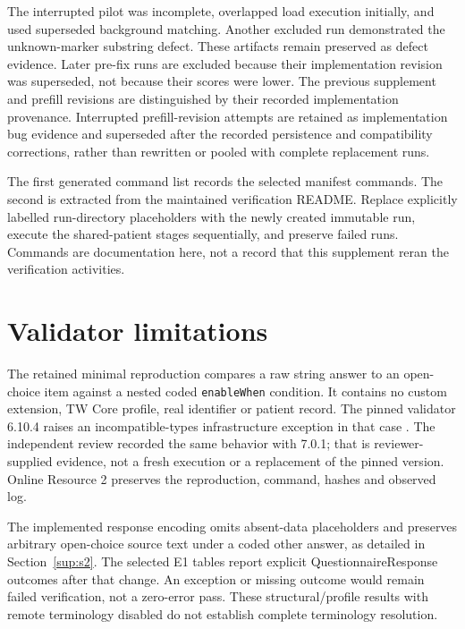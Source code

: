 
The interrupted pilot was incomplete, overlapped load execution initially, and used
superseded background matching. Another excluded run demonstrated the unknown-marker
substring defect. These artifacts remain preserved as defect evidence. Later
pre-fix runs are excluded because their implementation revision was superseded,
not because their scores were lower. The previous supplement and prefill revisions are distinguished by their recorded
implementation provenance. Interrupted prefill-revision attempts are retained as implementation bug
evidence and superseded after the recorded persistence and compatibility
corrections, rather than rewritten or pooled with complete replacement runs.

The first generated command list records the selected manifest commands. The
second is extracted from the maintained verification README. Replace explicitly labelled run-directory placeholders with the newly
created immutable run, execute the shared-patient stages sequentially, and preserve
failed runs. Commands are documentation here, not a record that this supplement
reran the verification activities.



\section{Validator limitations}\label{sup:s8}
The retained minimal reproduction compares a raw string answer to an open-choice
item against a nested coded \texttt{enableWhen} condition. It contains no custom
extension, TW Core profile, real identifier or patient record. The pinned validator
6.10.4 raises an incompatible-types infrastructure exception in that case
\citep{hl7Validator}. The independent review recorded the same behavior with 7.0.1;
that is reviewer-supplied evidence, not a fresh execution or a replacement of the
pinned version. Online Resource 2 preserves the reproduction, command, hashes and
observed log.

The implemented response encoding omits absent-data placeholders and preserves
arbitrary open-choice source text under a coded other answer, as detailed in
Section~\ref{sup:s2}. The selected E1 tables report explicit QuestionnaireResponse
outcomes after that change. An exception or missing outcome would remain failed
verification, not a zero-error pass. These structural/profile results with remote
terminology disabled do not establish complete terminology resolution.

